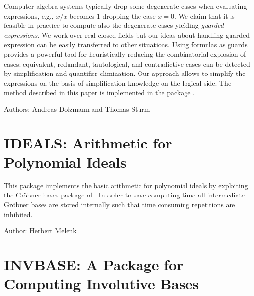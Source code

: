 Computer algebra systems typically drop some degenerate cases when
evaluating expressions, e.g., $x/x$ becomes $1$ dropping the case
$x=0$. We claim that it is feasible in practice to compute also the
degenerate cases yielding \emph{guarded expressions}. We work over real
closed fields but our ideas about handling guarded expression can be
easily transferred to other situations. Using formulas as guards
provides a powerful tool for heuristically reducing the combinatorial
explosion of cases: equivalent, redundant, tautological, and
contradictive cases can be detected by simplification and quantifier
elimination. Our approach allows to simplify the expressions on the
basis of simplification knowledge on the logical side. The method
described in this paper is implemented in the \REDUCE package
.

Authors: Andreas Dolzmann and Thomas Sturm



\newpage

\section{IDEALS: Arithmetic for Polynomial Ideals}

This package implements the basic arithmetic for polynomial ideals by
exploiting the Gr\"obner bases package of \REDUCE.  In order to save
computing time all intermediate Gr\"obner bases are stored internally such
that time consuming repetitions are inhibited.

Author: Herbert Melenk



\newpage

\iffalse
\section{INEQ: Support for Solving Inequalities}
\indexpackage{INEQ}

This package supports the operator \f{ineq\_solve} that
tries to solves single inequalities and sets of coupled inequalities.

Author: Herbert Melenk



\newpage
\fi

\section{INVBASE: A Package for Computing Involutive Bases}


